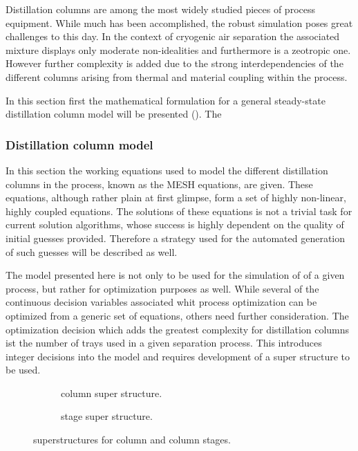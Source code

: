     Distillation columns are among the most widely studied pieces of process equipment. While much has been
    accomplished, the robust simulation poses great challenges to this day. In the context of cryogenic
    air separation the associated mixture displays only moderate non-idealities and furthermore is
    a zeotropic one. However further complexity is added due to the strong interdependencies of the different
    columns arising from thermal and material coupling within the process.

    In this section first the mathematical formulation for a general steady-state distillation column model will
    be presented (). The

    \subsubsection{Distillation column model}
    \label{sec:mathpro:steady:distmodel}

        In this section the working equations used to model the different distillation columns in the process,
        known as the MESH equations, are given. These equations, although rather plain at first glimpse, form a
        set of highly non-linear, highly coupled equations. The solutions of these equations is not a trivial
        task for current solution algorithms, whose success is highly dependent on the quality of initial guesses
        provided. Therefore a strategy used for the automated generation of such guesses will be described as well.

        The model presented here is not only to be used for the simulation of of a given process, but rather
        for optimization purposes as well. While several of the continuous decision variables associated
        whit process optimization can be optimized from a generic set of equations, others need further consideration.
        The optimization decision which adds the greatest complexity for distillation columns ist the number
        of trays used in a given separation process. This introduces integer decisions into the model and requires
        development of a super structure to be used.

        \begin{figure}
            \centering
            \begin{subfigure}{0.3\textwidth}
                \centering
                
                \caption{column super structure.}
                \label{fig:col_super}
            \end{subfigure}
            \qquad
            \begin{subfigure}{0.6\textwidth}
                \centering
                
                \caption{stage super structure.}
                \label{fig:col_stage_super}
            \end{subfigure}
            \caption{superstructures for column and column stages.}
        \end{figure}

